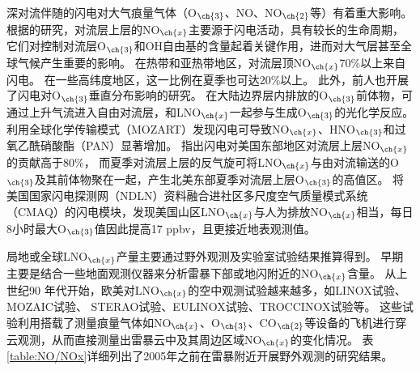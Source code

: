 深对流伴随的闪电对大气痕量气体（O$_{\ch{3}}$、NO、NO$_{\ch{2}}$等）有着重大影响\citep{DeCaria.2005,Schumann.2007,Ott.2010,Banerjee.2014}。
根据\citet{Levy.1996}的研究，对流层上层的NO$_{\ch{x}}$主要源于闪电活动，具有较长的生命周期，它们对控制对流层O$_{\ch{3}}$和OH自由基的含量起着关键作用，进而对大气层甚至全球气候产生重要的影响。
在热带和亚热带地区，对流层顶NO$_{\ch{x}}$70\%以上来自闪电。
在一些高纬度地区，这一比例在夏季也可达20\%以上\citep{Jourdain.2001,Martin.2002}。
此外，前人也开展了闪电对O$_{\ch{3}}$垂直分布影响的研究。
在大陆边界层内排放的O$_{\ch{3}}$前体物，可通过上升气流进入自由对流层，和LNO$_{\ch{x}}$一起参与生成O$_{\ch{3}}$的光化学反应\citep{Bond.2002}。
\citet{Tie.2001}利用全球化学传输模式（MOZART）发现闪电可导致NO$_{\ch{x}}$、HNO$_{\ch{3}}$和过氧乙酰硝酸酯（PAN）显著增加。
\citet{Cooper.2009}指出闪电对美国东部地区对流层上层NO$_{\ch{x}}$的贡献高于80\%，
而夏季对流层上层的反气旋可将LNO$_{\ch{x}}$与由对流输送的O$_{\ch{3}}$及其前体物聚在一起，产生北美东部夏季对流层上层O$_{\ch{3}}$的高值区。
\citet{Kang.2020}将美国国家闪电探测网（NDLN）资料融合进社区多尺度空气质量模式系统（CMAQ）的闪电模块，发现美国山区LNO$_{\ch{x}}$与人为排放NO$_{\ch{x}}$相当，每日8小时最大O$_{\ch{3}}$值因此提高17 ppbv，且更接近地表观测值。

局地或全球LNO$_{\ch{x}}$产量主要通过野外观测及实验室试验结果推算得到。
早期主要是结合一些地面观测仪器来分析雷暴下部或地闪附近的NO$_{\ch{x}}$含量。
从上世纪90 年代开始，欧美对LNO$_{\ch{x}}$的空中观测试验越来越多，如LINOX试验\citep{Huntrieser.1998}、 MOZAIC试验\citep{Marenco.1998}、
STERAO试验\citep{Dye.2000}、EULINOX试验\citep{Holler.2000}、TROCCINOX试验\citep{Huntrieser.2007}等。
这些试验利用搭载了测量痕量气体如NO$_{\ch{x}}$、O$_{\ch{3}}$、CO$_{\ch{2}}$等设备的飞机进行穿云观测，从而直接测量出雷暴云中及其周边区域NO$_{\ch{x}}$的变化情况。
表\ref{table:NO/NOx}详细列出了2005年之前在雷暴附近开展野外观测的研究结果。


